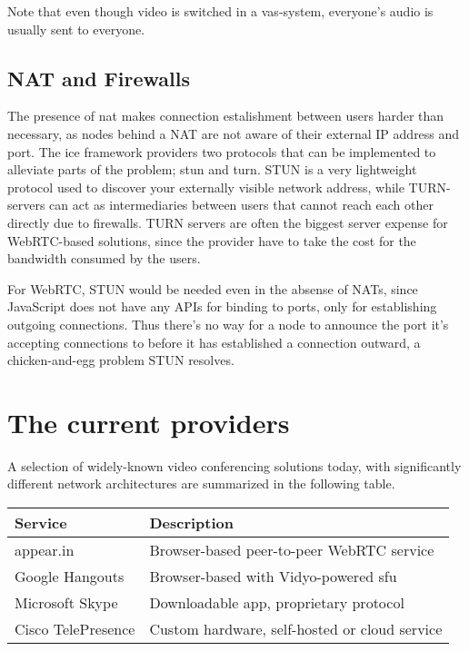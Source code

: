 Note that even though video is switched in a \gls{vas}-system, everyone's audio is usually sent to everyone.

\subsection{NAT and Firewalls}

The presence of \gls{nat} makes connection estalishment between users harder than necessary, as nodes behind a NAT are not aware of their external IP address and port. The \gls{ice} framework providers two protocols that can be implemented to alleviate parts of the problem; \gls{stun} and \gls{turn}. STUN is a very lightweight protocol used to discover your externally visible network address, while TURN-servers can act as intermediaries between users that cannot reach each other directly due to firewalls. TURN servers are often the biggest server expense for WebRTC-based solutions, since the provider have to take the cost for the bandwidth consumed by the users.

For WebRTC, STUN would be needed even in the absense of NATs, since JavaScript does not have any APIs for binding to ports, only for establishing outgoing connections. Thus there's no way for a node to announce the port it's accepting connections to before it has established a connection outward, a chicken-and-egg problem STUN resolves.


\section{The current providers}

A selection of widely-known video conferencing solutions today, with significantly different network architectures are summarized in the following table.

\begin{center}
	\label{tab:existing-solutions}
	\begin{tabular}{| l | l |}
		\hline
		\textbf{Service} & \textbf{Description} \\ \hline
		appear.in & Browser-based peer-to-peer WebRTC service \\ \hline
		Google Hangouts & Browser-based with Vidyo-powered \gls{sfu} \\ \hline
		Microsoft Skype & Downloadable app, proprietary protocol \\ \hline
		Cisco TelePresence & Custom hardware, self-hosted or cloud service \\ \hline
	\end{tabular}
\end{center}

